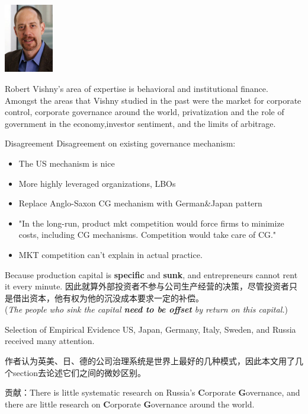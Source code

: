 	\begin{frame}{
	}%

	\includegraphics[height=3cm]{grap/vishny.jpg}

	Robert Vishny’s area of expertise is behavioral and institutional finance. Amongst the areas that Vishny studied in the past were the market for corporate control, corporate governance around the world, privatization and the role of government in the economy,investor sentiment, and the limits of arbitrage.
\end{frame}

	\begin{frame}{Disagreement}
		Disagreement on existing governance mechanism:
		\begin{itemize}
			\item The US mechanism is nice
			\item More highly leveraged organizations, LBOs
			\item Replace Anglo-Saxon CG mechanism with German\&Japan pattern
		\end{itemize}
\end{frame}

\begin{frame}
	\begin{itemize}
		\item "In the long-run, product mkt competition would force firms to minimize costs, including CG mechanisms. Competition would take care of CG."
		\item MKT competition can't explain in actual practice.\\
	
	\end{itemize}
	 Because production capital is \textbf{specific} and \textbf{sunk}, and entrepreneurs cannot rent it every minute. 因此就算外部投资者不参与公司生产经营的决策，尽管投资者只是借出资本，他有权为他的沉没成本要求一定的补偿。\\
	(\textit{The people who sink the capital \textbf{need to be offset} by return on this capital.})
\end{frame}

	\begin{frame}{Selection of Empirical Evidence}
	\onslide<1-> US, Japan, Germany, Italy, Sweden, and Russia received many attention.\par
	 作者认为英美、日、德的公司治理系统是世界上最好的几种模式，因此本文用了几个section去论述它们之间的微妙区别。\par
	 贡献：There is little systematic research on Russia's 
	\textbf{C}orporate \textbf{G}overnance, and there are little research on \textbf{C}orporate \textbf{G}overnance around the world. 
	
\end{frame}

